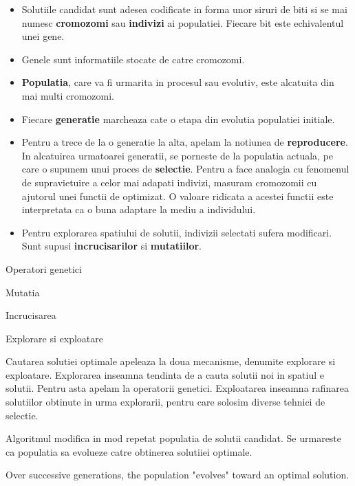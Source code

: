 \begin{itemize}
	
	\item Solutiile candidat sunt adesea codificate in forma unor siruri de biti si se mai numesc \textbf{cromozomi} sau \textbf{indivizi} ai populatiei. Fiecare bit este echivalentul unei gene.
	
	\item Genele sunt informatiile stocate de catre cromozomi.
	
	\item \textbf{Populatia}, care va fi urmarita in procesul sau evolutiv, este alcatuita din mai multi cromozomi.
	
	\item Fiecare \textbf{generatie} marcheaza cate o etapa din evolutia populatiei initiale.
	
	\item Pentru a trece de la o generatie la alta, apelam la notiunea de \textbf{reproducere}. In alcatuirea urmatoarei generatii, se porneste de la populatia actuala, pe care o supunem unui proces de \textbf{selectie}. Pentru a face analogia cu fenomenul de supravietuire a celor mai adapati indivizi, masuram cromozomii cu ajutorul unei functii de optimizat. O valoare ridicata a acestei functii este interpretata ca o buna adaptare la mediu a individului. 
	
	\item Pentru explorarea spatiului de solutii, indivizii selectati sufera modificari. Sunt supusi \textbf{incrucisarilor} si \textbf{mutatiilor}.
	
\end{itemize}

Operatori genetici

Mutatia 

Incrucisarea

Explorare si exploatare

Cautarea solutiei optimale apeleaza la doua mecanisme, denumite explorare si exploatare. 
Explorarea inseamna tendinta de a cauta solutii noi in spatiul e solutii. Pentru asta apelam la operatorii genetici. Exploatarea inseamna rafinarea solutiilor obtinute in urma explorarii, pentru care solosim diverse tehnici de selectie.


Algoritmul modifica in mod repetat populatia de solutii candidat. Se urmareste ca populatia sa evolueze catre obtinerea solutiiei optimale.

Over successive generations, the population "evolves" toward an optimal solution.

